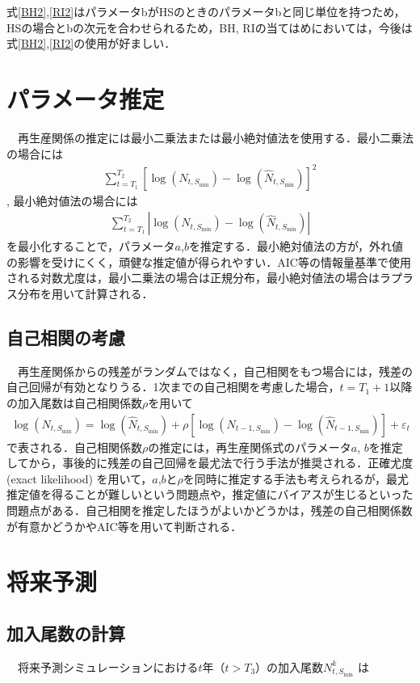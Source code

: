 \documentclass[11pt]{jsarticle}
\begin{document}
式\ref{BH2},\ref{RI2}はパラメータbがHSのときのパラメータbと同じ単位を持つため，HSの場合とbの次元を合わせられるため，BH, RIの当てはめにおいては，今後は式\ref{BH2},\ref{RI2}の使用が好ましい．

\section{パラメータ推定}
　再生産関係の推定には最小二乗法または最小絶対値法を使用する．最小二乗法の場合には
\begin{eqnarray}
  \sum_{t=T_1}^{T_2} [ \log (N_{t,S_{\mathrm{min}}}) - \log (\hat{N}_{t,S_{\mathrm{min}}}) ]^2
\end{eqnarray}
, 最小絶対値法の場合には
\begin{eqnarray}
  \sum_{t=T_1}^{T_2} | \log (N_{t,S_{\mathrm{min}}}) - \log (\hat{N}_{t,S_{\mathrm{min}}}) |
\end{eqnarray}
を最小化することで，パラメータ$a$,$b$を推定する．最小絶対値法の方が，外れ値の影響を受けにくく，頑健な推定値が得られやすい．AIC等の情報量基準で使用される対数尤度は，最小二乗法の場合は正規分布，最小絶対値法の場合はラプラス分布を用いて計算される．

\subsection{自己相関の考慮}
　再生産関係からの残差がランダムではなく，自己相関をもつ場合には，残差の自己回帰が有効となりうる．1次までの自己相関を考慮した場合，$t=T_1+1$以降の加入尾数は自己相関係数$\rho$を用いて
\begin{eqnarray}
  \log (N_{t,S_{\mathrm{min}}}) = \log (\hat{N}_{t,S_{\mathrm{min}}}) + \rho [ \log (N_{t-1,S_{\mathrm{min}}})-\log(\hat{N}_{t-1,S_{\mathrm{min}}}) ] + \varepsilon_t
\end{eqnarray}
で表される\cite{thorson}\cite{johnson}．自己相関係数$\rho$の推定には，再生産関係式のパラメータ$a$, $b$を推定してから，事後的に残差の自己回帰を最尤法で行う手法が推奨される．正確尤度 (exact likelihood) を用いて，$a$,$b$と$\rho$を同時に推定する手法も考えられるが，最尤推定値を得ることが難しいという問題点や，推定値にバイアスが生じるといった問題点がある\cite{johnson}．自己相関を推定したほうがよいかどうかは，残差の自己相関係数が有意かどうかやAIC等を用いて判断される．

\section{将来予測}
\subsection{加入尾数の計算}
　将来予測シミュレーションにおける$t$年（$t>T_3$）の加入尾数$N_{t,S_{\mathrm{min}}}^k$ は
\end{document}
